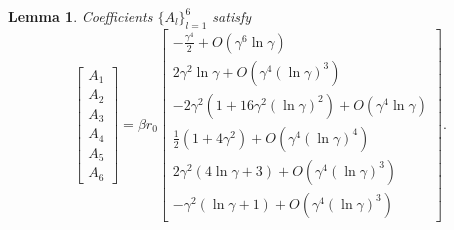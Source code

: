 \documentclass[11pt,letterpaper]{amsart}
\newtheorem{lemma}[theorem]{Lemma}
\theoremstyle{definition}
\theoremstyle{remark}
\numberwithin{equation}{section}
\begin{document}
\begin{lemma}\label{corfficient-e}
    Coefficients $\{A_l\}_{l=1}^6$ satisfy
    \begin{equation*}
    \begin{bmatrix}
        A_1\\
        A_2\\
        A_3\\
        A_4\\
        A_5\\
        A_6
    \end{bmatrix}=\beta r_0\begin{bmatrix}
       -\frac{\gamma^4}{2}+O(\gamma^6\ln \gamma)\\
        2\gamma^2\ln \gamma+O(\gamma^4(\ln \gamma)^3)\\
        -2\gamma^2\left(1+16\gamma^2(\ln \gamma)^2\right)+O(\gamma^4\ln \gamma)\\
       \frac{1}{2}\left(1+4\gamma^2\right)+O(\gamma^4(\ln \gamma)^4)\\
        2\gamma^2\left(4\ln \gamma+3\right)+O(\gamma^4(\ln \gamma)^3)\\
        -\gamma^2 \left(\ln \gamma+1\right)+O(\gamma^4(\ln \gamma)^3)
    \end{bmatrix}.
\end{equation*}
\end{lemma}
\end{document}
